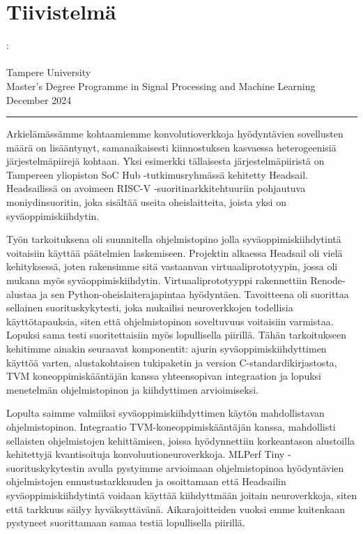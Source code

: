 \documentclass[12pt,a4paper,english
]{tunithesis}
\begin{document}
\clearpage

\chapter*{Tiivistelmä}

\begin{spacing}{1.0}
\noindent \@author: \@title\\
\@thesistype\\
Tampere University\\
Master’s Degree Programme in Signal Processing and Machine Learning\\
December 2024
\end{spacing}
\noindent\rule{12cm}{0.4pt}

\vspace{0.5cm}


\noindent \foreignlanguage{finnish}{Arkielämässämme kohtaamiemme konvolutioverkkoja hyödyntävien sovellusten määrä on lisääntynyt, samanaikaisesti kiinnostuksen kasvaessa heterogeenisiä järjestelmäpiirejä kohtaan. Yksi esimerkki tällaisesta järjestelmäpiiristä on Tampereen yliopiston SoC Hub -tutkimusryhmässä kehitetty Headsail. Headsailissä on avoimeen RISC-V -suoritinarkkitehtuuriin pohjautuva moniydinsuoritin, joka sisältää useita
oheislaitteita, joista yksi on syväoppimiskiihdytin.}

\foreignlanguage{finnish}{Työn tarkoituksena oli suunnitella ohjelmistopino jolla syväoppimiskiihdytintä voitaisiin käyttää päätelmien laskemiseen.
Projektin alkaessa Headsail oli vielä kehityksessä, joten rakensimme sitä vastaanvan virtuaaliprototyypin, jossa oli mukana myös syväoppimiskiihdytin. Virtuaaliprototyyppi rakennettiin Renode-alustaa ja sen Python-oheislaiterajapintaa hyödyntäen. Tavoitteena oli suorittaa sellainen suorituskykytesti, joka mukailisi neuroverkkojen todellisia käyttötapauksia, siten että ohjelmistopinon soveltuvuus voitaisiin varmistaa. Lopuksi sama testi suoritettaisiin myös lopullisella piirillä. Tähän tarkoitukseen kehitimme ainakin seuraavat komponentit: ajurin syväoppimiskiihdyttimen käyttöä varten, alustakohtaisen tukipaketin ja version C-standardikirjastosta, TVM koneoppimiskääntäjän kanssa yhteensopivan integraation ja lopuksi menetelmän ohjelmistopinon  ja kiihdyttimen arvioimiseksi.}

\foreignlanguage{finnish}{Lopulta saimme valmiiksi syväoppimiskiihdyttimen käytön mahdollistavan ohjelmistopinon. Integraatio TVM-koneoppimiskääntäjän kanssa, mahdollisti sellaisten ohjelmistojen kehittämisen, joissa hyödynnettiin korkeantason alustoilla kehitettyjä kvantisoituja konvoluutioneuroverkkoja. MLPerf Tiny -suorituskykytestin avulla pystyimme arvioimaan ohjelmistopinoa hyödyntävien ohjelmistojen ennustustarkkuuden ja osoittamaan että Headsailin syväoppimiskiihdytintä voidaan käyttää kiihdyttmään joitain neuroverkkoja, siten että tarkkuus säilyy hyväksyttävänä. Aikarajoitteiden vuoksi emme kuitenkaan pystyneet suorittamaan samaa testiä lopullisella piirillä.}
\end{document}
